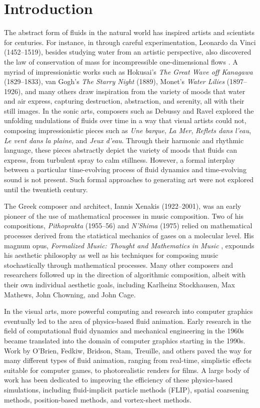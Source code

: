 \chapter{Introduction}
\label{chap:Intro}

The abstract form of fluids in the natural world has inspired artists and scientists for centuries. 
For instance, in through careful experimentation, Leonardo da Vinci (1452--1519), besides studying water from an artistic perspective, also discovered the law of conservation of mass for incompressible one-dimensional flows \cite{gad1998fluid}. A myriad of impressionistic works such as Hokusai's {\em The Great Wave off Kanagawa} (1829--1833), van Gogh's {\em The Starry Night} (1889), Monet's {\em Water Lilies} (1897--1926), and many others draw inspiration from the variety of moods that water and air express, capturing destruction, abstraction, and serenity, all with their still images. In the sonic arts, composers such as Debussy and Ravel explored the unfolding undulations of fluids over time in a way that visual artists could not, composing impressionistic pieces such as {\em Une barque}, {\em La Mer}, {\em Reflets dans l'eau}, {\em Le vent dans la plaine}, and {\em Jeux d'eau}. Through their harmonic and rhythmic language, these pieces abstractly depict the variety of moods that fluids can express, from turbulent spray to calm stillness. However, a formal interplay between a particular time-evolving process of fluid dynamics and time-evolving sound is not present. Such formal approaches to generating art were not explored until the twentieth century.

The Greek composer and architect, Iannis Xenakis (1922--2001), was an early pioneer of the use of mathematical processes in music composition. Two of his compositions, {\em Pithoprakta} (1955--56) and {\em N'Shima} (1975) relied on mathematical processes derived from the statistical mechanics of gases on a molecular level. His magnum opus, {\em Formalized Music: Thought and Mathematics in Music} \cite{xenakis1992formalized}, expounds his aesthetic philosophy as well as his techniques for composing music stochastically through mathematical processes. Many other composers and researchers followed up in the direction of algorithmic
composition, albeit with their own individual aesthetic goals, including Karlheinz Stockhausen, Max Mathews, John Chowning, and John Cage.

In the visual arts, more powerful computing and research into computer graphics eventually led to the area of physics-based fluid animation. Early research in the field of computational fluid dynamics and mechanical engineering in the 1960s became translated into the domain of computer graphics starting in the 1990s. Work by O'Brien, Fedkiw, Bridson, Stam, Treuille, and others paved the way for many different types of fluid animation, ranging from real-time, simplistic effects suitable for computer games, to photorealistic renders for films. A large body of work has been dedicated to improving the efficiency of these physics-based simulations, including
fluid-implicit particle methods (FLIP), spatial coarsening methods, position-based methods, and vortex-sheet methods. \cite{brackbill1988flip, Ando:2013:HAL, Macklin:2014, Pfa12}

